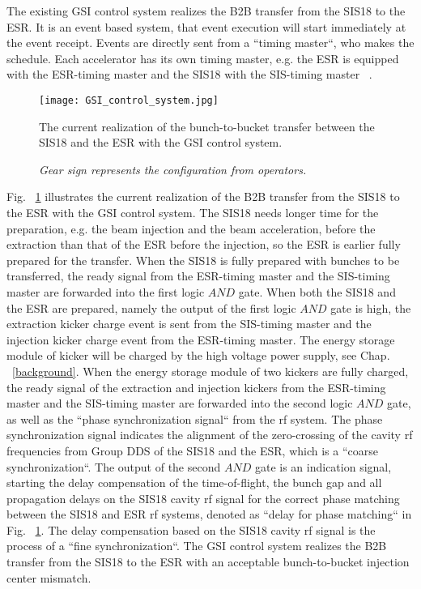 The existing GSI control system realizes the B2B transfer from the SIS18 to the ESR. It is an event based system, that event execution will start immediately at the event receipt. Events are directly sent from a ``timing master``, who makes the schedule. Each accelerator has its own timing master, e.g. the ESR is equipped with the ESR-timing master and the SIS18 with the SIS-timing master ~\cite{kainberger_pzs_2003, krause_re-engineering_2001}.
\begin{figure}[H]
   \centering   
   \texttt{[image: GSI\_control\_system.jpg]}
   \caption{The current realization of the bunch-to-bucket transfer between the SIS18 and the ESR with the GSI control system.}
	\caption*{\textsl{\small{Gear sign represents the configuration from operators.}}}
   \label{GSI_control_system}
\end{figure}
Fig. ~\ref{GSI_control_system} illustrates the current realization of the B2B transfer from the SIS18 to the ESR with the GSI control system. The SIS18 needs longer time for the preparation, e.g. the beam injection and the beam acceleration, before the extraction than that of the ESR before the injection, so the ESR is earlier fully prepared for the transfer. When the SIS18 is fully prepared with bunches to be transferred, the ready signal from the ESR-timing master and the SIS-timing master are forwarded into the first logic $\textit{AND}$ gate. When both the SIS18 and the ESR are prepared, namely the output of the first logic $\textit{AND}$ gate is high, the extraction kicker charge event is sent from the SIS-timing master and the injection kicker charge event from the ESR-timing master. The energy storage module of kicker will be charged by the high voltage power supply, see Chap. ~\ref{background}. When the energy storage module of two kickers are fully charged, the ready signal of the extraction and injection kickers from the ESR-timing master and the SIS-timing master are forwarded into the second logic $\textit{AND}$ gate, as well as the ``phase synchronization signal`` from the rf system. The phase synchronization signal indicates the alignment of the zero-crossing of the cavity rf frequencies from Group DDS of the SIS18 and the ESR, which is a ``coarse synchronization``. The output of the second $\textit{AND}$ gate is an indication signal, starting the delay compensation of the time-of-flight, the bunch gap and all propagation delays on the SIS18 cavity rf signal for the correct phase matching between the SIS18 and ESR rf systems, denoted as ``delay for phase matching`` in Fig. ~\ref{GSI_control_system}. The delay compensation based on the SIS18 cavity rf signal is the process of a ``fine synchronization``. The GSI control system realizes the B2B transfer from the SIS18 to the ESR with an acceptable bunch-to-bucket injection center mismatch.

